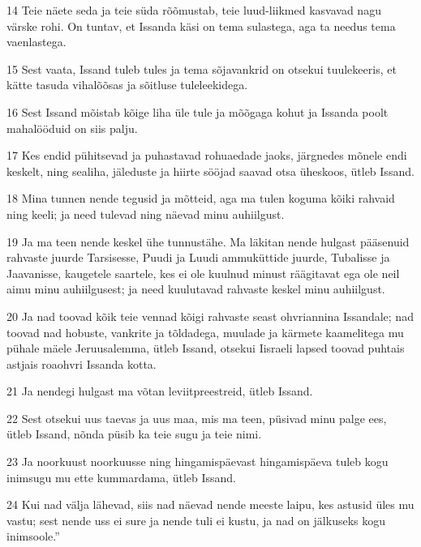 \par 14 Teie näete seda ja teie süda rõõmustab, teie luud-liikmed kasvavad nagu värske rohi. On tuntav, et Issanda käsi on tema sulastega, aga ta needus tema vaenlastega.
\par 15 Sest vaata, Issand tuleb tules ja tema sõjavankrid on otsekui tuulekeeris, et kätte tasuda vihalõõsas ja sõitluse tuleleekidega.
\par 16 Sest Issand mõistab kõige liha üle tule ja mõõgaga kohut ja Issanda poolt mahalööduid on siis palju.
\par 17 Kes endid pühitsevad ja puhastavad rohuaedade jaoks, järgnedes mõnele endi keskelt, ning sealiha, jäleduste ja hiirte sööjad saavad otsa üheskoos, ütleb Issand.
\par 18 Mina tunnen nende tegusid ja mõtteid, aga ma tulen koguma kõiki rahvaid ning keeli; ja need tulevad ning näevad minu auhiilgust.
\par 19 Ja ma teen nende keskel ühe tunnustähe. Ma läkitan nende hulgast pääsenuid rahvaste juurde Tarsisesse, Puudi ja Luudi ammuküttide juurde, Tubalisse ja Jaavanisse, kaugetele saartele, kes ei ole kuulnud minust räägitavat ega ole neil aimu minu auhiilgusest; ja need kuulutavad rahvaste keskel minu auhiilgust.
\par 20 Ja nad toovad kõik teie vennad kõigi rahvaste seast ohvriannina Issandale; nad toovad nad hobuste, vankrite ja tõldadega, muulade ja kärmete kaamelitega mu pühale mäele Jeruusalemma, ütleb Issand, otsekui Iisraeli lapsed toovad puhtais astjais roaohvri Issanda kotta.
\par 21 Ja nendegi hulgast ma võtan leviitpreestreid, ütleb Issand.
\par 22 Sest otsekui uus taevas ja uus maa, mis ma teen, püsivad minu palge ees, ütleb Issand, nõnda püsib ka teie sugu ja teie nimi.
\par 23 Ja noorkuust noorkuusse ning hingamispäevast hingamispäeva tuleb kogu inimsugu mu ette kummardama, ütleb Issand.
\par 24 Kui nad välja lähevad, siis nad näevad nende meeste laipu, kes astusid üles mu vastu; sest nende uss ei sure ja nende tuli ei kustu, ja nad on jälkuseks kogu inimsoole.”



